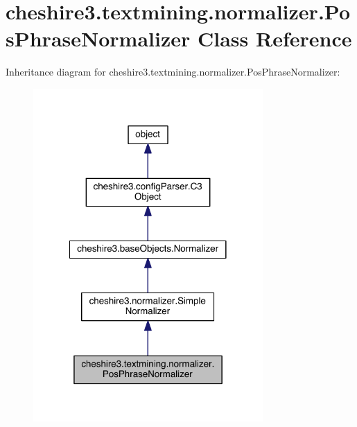 \hypertarget{classcheshire3_1_1textmining_1_1normalizer_1_1_pos_phrase_normalizer}{\section{cheshire3.\-textmining.\-normalizer.\-Pos\-Phrase\-Normalizer Class Reference}
\label{classcheshire3_1_1textmining_1_1normalizer_1_1_pos_phrase_normalizer}
}


Inheritance diagram for cheshire3.\-textmining.\-normalizer.\-Pos\-Phrase\-Normalizer\-:
\nopagebreak
\begin{figure}[H]
\begin{center}
\leavevmode
\includegraphics[width=248pt]{classcheshire3_1_1textmining_1_1normalizer_1_1_pos_phrase_normalizer__inherit__graph}
\end{center}
\end{figure}


